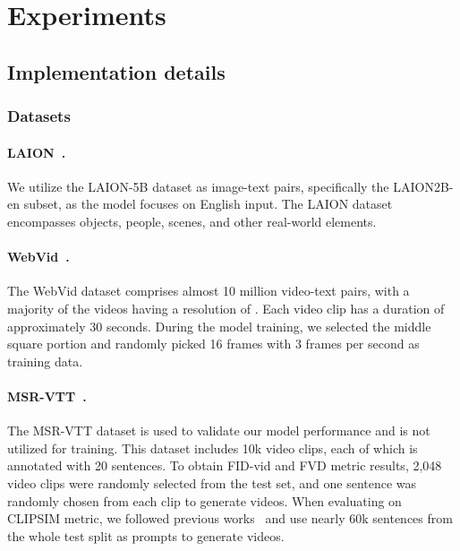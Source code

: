 \section{Experiments}

\subsection{Implementation details}

\subsubsection{Datasets}

\paragraph{LAION~\cite{schuhmann2021laion}.} We utilize the LAION-5B dataset as image-text pairs, specifically the LAION2B-en subset, as the model focuses on English input. The LAION dataset encompasses objects, people, scenes, and other real-world elements. 

\paragraph{WebVid~\cite{Bain21}.} The WebVid dataset comprises almost 10 million video-text pairs, with a majority of the videos having a resolution of . Each video clip has a duration of approximately 30 seconds. During the model training, we selected the middle square portion and randomly picked 16 frames with 3 frames per second as training data.

\paragraph{MSR-VTT~\cite{xu2016msr-vtt}.} The MSR-VTT dataset is used to validate our model performance and is not utilized for training. This dataset includes 10k video clips, each of which is annotated with 20 sentences. To obtain FID-vid and FVD metric results, 2,048 video clips were randomly selected from the test set, and one sentence was randomly chosen from each clip to generate videos. When evaluating on CLIPSIM metric, we followed previous works~\cite{singer2022make-a-video,wu2022nuwa} and use nearly 60k sentences from the whole test split as prompts to generate videos.

